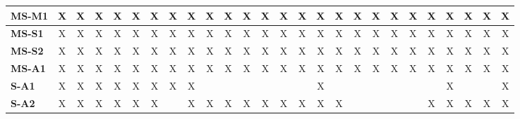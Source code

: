 \documentclass[12pt]{article}
\begin{document}
\begin{table}[H]
\begin{adjustwidth}{-1.4in}{-1in}
{\begin{tabular}{c|c|c|c|c|c|c|c|c|c|c|c|c|c|c|c|c|c|c|c|c|c|c|c|c|c|}
  \multicolumn{1}{|l|}{\textbf{MS-M1}}   &       X      &       X      &       X      &       X      &       X      &       X      &       X      &       X      &       X      &       X      &       X      &       X      &       X      &       X      &       X      &       X      &       X      &       X      &       X      &       X      &       X      &       X      &       X      &       X      &       X       \\ \hline
  \multicolumn{1}{|l|}{\textbf{MS-S1}}   &       X      &       X      &       X      &       X      &       X      &       X      &       X      &       X      &       X      &       X      &       X      &       X      &       X      &       X      &       X      &       X      &       X      &       X      &       X      &       X      &       X      &       X      &       X      &       X      &       X       \\ \hline
  \multicolumn{1}{|l|}{\textbf{MS-S2}}   &       X      &       X      &       X      &       X      &       X      &       X      &       X      &       X      &       X      &       X      &       X      &       X      &       X      &       X      &       X      &       X      &       X      &       X      &       X      &       X      &       X      &       X      &       X      &       X      &       X       \\ \hline
  \multicolumn{1}{|l|}{\textbf{MS-A1}}   &       X      &       X      &       X      &       X      &       X      &       X      &       X      &       X      &       X      &       X      &       X      &       X      &       X      &       X      &       X      &       X      &       X      &       X      &       X      &       X      &       X      &       X      &       X      &       X      &       X       \\ \hline
  \multicolumn{1}{|l|}{\textbf{S-A1}}    &       X      &       X      &       X      &       X      &       X      &       X      &       X      &       X      &              &              &              &              &              &              &       X      &              &              &              &              &              &              &       X      &              &              &       X       \\ \hline
  \multicolumn{1}{|l|}{\textbf{S-A2}}    &       X      &       X      &       X      &       X      &       X      &       X      &              &       X      &       X      &       X      &       X      &       X      &       X      &       X      &       X      &       X      &              &              &              &              &       X      &       X      &       X      &       X      &       X       \\ \hline

\end{tabular}}
\end{adjustwidth}
\end{table}
\end{document}
